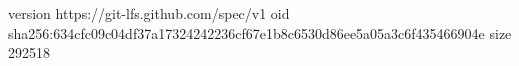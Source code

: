 version https://git-lfs.github.com/spec/v1
oid sha256:634cfc09c04df37a17324242236cf67e1b8c6530d86ee5a05a3c6f435466904e
size 292518
